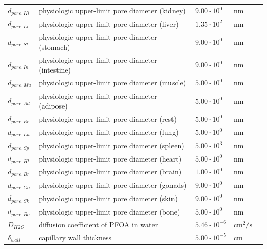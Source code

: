\documentclass[preprint,12pt,authoryear]{elsarticle}
\begin{document}
\begin{longtable}{P{2cm}P{3.5cm}P{2cm}P{1cm}P{2.5cm}}
$d_{pore,Ki}$ & physiologic upper-limit pore diameter (kidney)   & $9.00 \cdot 10^{0}$  & $\text{nm}$ & \citep{sarin_2010} \\
$d_{pore,Li}$ & physiologic upper-limit pore diameter (liver)    & $1.35 \cdot 10^{2}$  & $\text{nm}$ & \citep{sarin_2010} \\
$d_{pore,St}$ & physiologic upper-limit pore diameter (stomach)  & $9.00 \cdot 10^{0}$  & $\text{nm}$ & \citep{sarin_2010} \\
$d_{pore,In}$ & physiologic upper-limit pore diameter (intestine)& $9.00 \cdot 10^{0}$  & $\text{nm}$ & \citep{sarin_2010} \\
$d_{pore,Mu}$ & physiologic upper-limit pore diameter (muscle)   & $5.00 \cdot 10^{0}$  & $\text{nm}$ & \citep{sarin_2010} \\
$d_{pore,Ad}$ & physiologic upper-limit pore diameter (adipose)  & $5.00 \cdot 10^{0}$  & $\text{nm}$ & \citep{sarin_2010} \\
$d_{pore,Re}$ & physiologic upper-limit pore diameter (rest)     & $5.00 \cdot 10^{0}$  & $\text{nm}$ & \citep{sarin_2010} \\
$d_{pore,Lu}$ & physiologic upper-limit pore diameter (lung)     & $5.00 \cdot 10^{0}$  & $\text{nm}$ & \citep{sarin_2010} \\
$d_{pore,Sp}$ & physiologic upper-limit pore diameter (spleen)   & $5.00 \cdot 10^{3}$  & $\text{nm}$ & \citep{sarin_2010} \\
$d_{pore,Ht}$ & physiologic upper-limit pore diameter (heart)    & $5.00 \cdot 10^{0}$  & $\text{nm}$ & \citep{sarin_2010} \\
$d_{pore,Br}$ & physiologic upper-limit pore diameter (brain)    & $1.00 \cdot 10^{0}$  & $\text{nm}$ & \citep{sarin_2010} \\
$d_{pore,Go}$ & physiologic upper-limit pore diameter (gonads)   & $9.00 \cdot 10^{0}$  & $\text{nm}$ & \citep{sarin_2010} \\
$d_{pore,Sk}$ & physiologic upper-limit pore diameter (skin)     & $9.00 \cdot 10^{0}$  & $\text{nm}$ & \citep{sarin_2010} \\
$d_{pore,Bo}$ & physiologic upper-limit pore diameter (bone)     & $5.00 \cdot 10^{0}$  & $\text{nm}$ & \citep{sarin_2010} \\

$D_{H2O}$ & diffusion coefficient of PFOA in water               & $5.46 \cdot 10^{-6}$ & $\text{cm}^2/\text{s}$ & \citep{gauthier_2024} \\
$\delta_{wall}$ & capillary wall thickness                             & $5.00 \cdot 10^{-5}$ & $\text{cm}$            & \citep{ashoor_2019} \\


\end{longtable}
\end{document}
